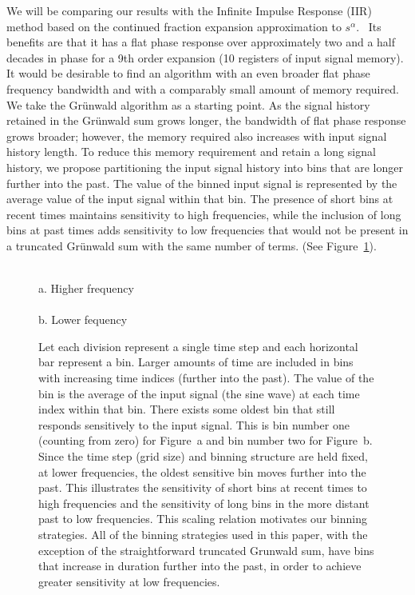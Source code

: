 We will be comparing our results with the Infinite Impulse Response (IIR) method 
based on the continued fraction expansion approximation to
$s^\alpha$.~\cite{Chen:04a} Its benefits are that it has a flat phase response over
approximately two and a half decades in phase for a 9th order
expansion (10 registers of input signal memory). It would be desirable
to find an algorithm with an even broader flat phase frequency
bandwidth and with a comparably small amount of memory required. We
take the Gr{\"u}nwald algorithm as a starting point. As the signal history
retained in the Gr{\"u}nwald sum grows longer, the bandwidth of flat phase
response grows broader; however, the memory required also increases
with input signal history length. To reduce this memory requirement
and retain a long signal history, we propose partitioning the input
signal history into bins that are longer further into the past. The
value of the binned input signal is represented by the average value
of the input signal within that bin. The presence of short bins at
recent times maintains sensitivity to high frequencies, while the 
inclusion of long bins at past times adds sensitivity to low frequencies 
that would not be present in a truncated Gr{\"u}nwald 
sum with the same number of terms. (See Figure~\ref{fig:freqScaling}).


\begin{figure}
\centering
{}
\\a. Higher frequency\\
\\b. Lower fequency
\caption{Let each division represent a single time step and each horizontal  bar represent a bin. Larger amounts of time are included in bins with increasing time indices (further into the past). The value of the bin is the average of the input signal (the sine wave) at each time index within that bin. There exists some oldest bin that still responds sensitively to the input signal. This is bin number one (counting from zero) for Figure~a and bin number two for Figure~b. Since the time step (grid size) and binning structure are held fixed, at lower frequencies, the oldest sensitive bin moves further into the past. This illustrates the sensitivity of short bins at recent times to high frequencies and the sensitivity of long bins in the more distant past to low frequencies. This scaling relation motivates our binning strategies. All of the binning strategies used in this paper, with the exception of the straightforward truncated Grunwald sum, have bins that increase in duration further into the past, in order to achieve greater sensitivity at low frequencies.}
\label{fig:freqScaling}
\end{figure}


